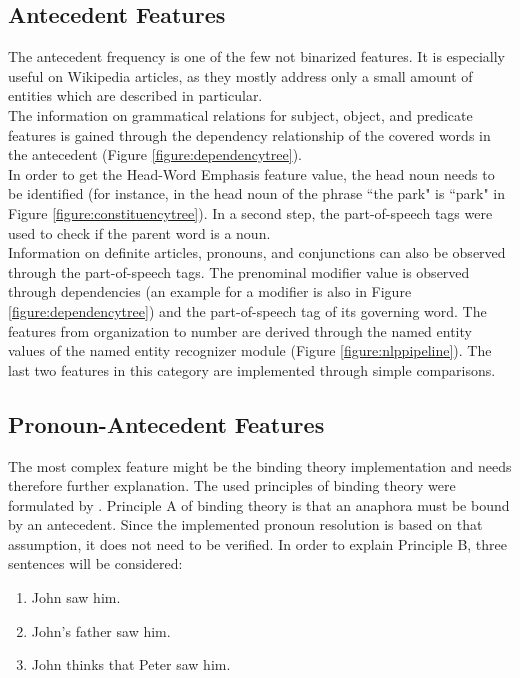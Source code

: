 \subsection{Antecedent Features}
The antecedent frequency is one of the few not binarized features. It is especially useful on Wikipedia articles, as they mostly address only a small amount of entities which are described in particular. \\
The information on grammatical relations for subject, object, and predicate features is gained through the dependency relationship of the covered words in the antecedent (Figure  \ref{figure:dependencytree}).\\
In order to get the Head-Word Emphasis feature value, the head noun needs to be identified (for instance, in the head noun of the phrase ``the park" is ``park" in Figure \ref{figure:constituencytree}). In a second step, the part-of-speech tags were used to check if the parent word is a noun.\\
Information on definite articles, pronouns, and conjunctions can also be observed through the part-of-speech tags.
The prenominal modifier value is observed through dependencies (an example for a modifier is also in Figure \ref{figure:dependencytree}) and the part-of-speech tag of its governing word. 
The features from organization to number are derived through the named entity values of the named entity recognizer module (Figure \ref{figure:nlppipeline}).
The last two features in this category are implemented through simple comparisons.

\subsection{Pronoun-Antecedent Features}
The most complex feature might be the binding theory implementation and needs therefore further explanation. The used principles of binding theory were formulated by \cite{chomsky1993lectures}. Principle A of binding theory is that an anaphora must be bound by an antecedent. Since the implemented pronoun resolution is based on that assumption, it does not need to be verified. In order to explain Principle B, three sentences will be considered:

\begin{center}
	\begin{enumerate}[label={(\arabic*)}]
	\item  \label{example1} John saw him.
	\item  \label{example2} John's father saw him.
	\item  \label{example3} John thinks that Peter saw him.
	\end{enumerate}
\end{center}

